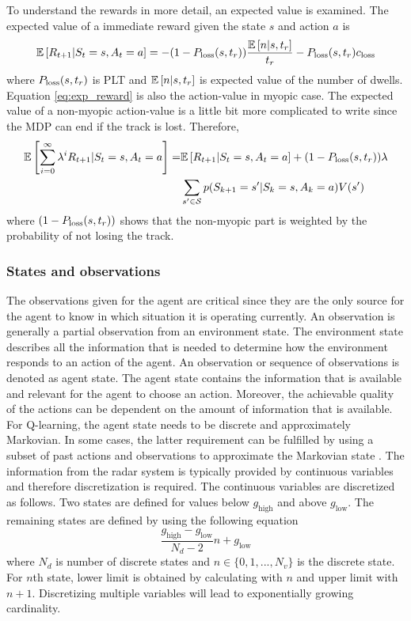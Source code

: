 \documentclass[english, 12pt, a4paper, elec, utf8, a-1b, online]{aaltothesis}
\newcommand{\Ss}{\mathcal{S}}
\newcommand{\E}[1]{\mathbb{E}\left[ #1 \right]}
\newcommand{\closs}{c_\text{loss}}
\begin{document}
To understand the rewards in more detail, an expected value is examined.
The expected value of a immediate reward given the state $s$ and action $a$ is
\begin{equation}\label{eq:exp_reward}
    \E{R_{t+1} | S_t=s, A_t=a} = -(1-\ploss(s, t_r)) 
        \frac
        {
            \mathbb{E} \left[ n | s, t_r \right]
        }
        {
        \ri
        } 
        - \ploss(s, t_r) \closs
\end{equation}
where $P_\text{loss}(s, t_r)$ is PLT and $\E{n|s, \ri}$ is expected value of the number of dwells.
Equation \eqref{eq:exp_reward} is also the action-value in myopic case.
The expected value of a non-myopic action-value is a little bit more complicated to write since the MDP can end if the track is lost.
Therefore, 
\begin{align}
    \E{\sum_{i=0}^\infty \lambda^i R_{t+1} | S_t=s, A_t=a} =& \E{R_{t+1} | S_t=s, A_t=a} + (1-\ploss(s, t_r)) \lambda \\
    & \sum_{s'\in \Ss} p(S_{k+1}=s'|S_{k}=s, A_{k}=a)  V(s')  
\end{align}
where $(1-P_\text{loss}(s, t_r))$ shows that the non-myopic part is weighted by the probability of not losing the track.

\subsubsection{States and observations} \label{sec:states}

\newcommand{\glow}{g_\text{low}}
\newcommand{\ghigh}{g_\text{high}}

The observations given for the agent are critical since they are the only source for the agent to know in which situation it is operating currently.
An observation is generally a partial observation from an environment state.
The environment state describes all the information that is needed to determine how the environment responds to an action of the agent. 
An observation or sequence of observations is denoted as agent state.
The agent state contains the information that is available and relevant for the agent to choose an action.
Moreover, the achievable quality of the actions can be dependent on the amount of information that is available. 
For Q-learning, the agent state needs to be discrete and approximately Markovian.
In some cases, the latter requirement can be fulfilled by using a subset of past actions and observations to approximate the Markovian state \cite{Mnih2013}.
The information from the radar system is typically provided by continuous variables and therefore discretization is required.
The continuous variables are discretized as follows. 
Two states are defined for values below $\ghigh$ and above $\glow$. 
The remaining states are defined by using the following equation 
\begin{equation}\label{eq:state_limits}
    \frac{\ghigh - \glow}{N_d - 2} n + \glow
\end{equation}
where $N_d$ is number of discrete states and $n \in \{0, 1, ..., N_v\}$ is the discrete state.
For $n$th state, lower limit is obtained by calculating \label{eq:state_limits} with $n$ and upper limit with $n+1$.
Discretizing multiple variables will lead to exponentially growing cardinality.
\end{document}
